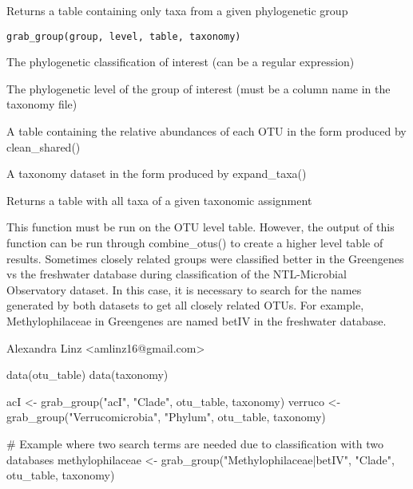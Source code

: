 \documentclass[a4paper]{book}
\begin{document}
%
\begin{Description}\relax
Returns a table containing only taxa from a given phylogenetic group
\end{Description}
%
\begin{Usage}
\begin{verbatim}
grab_group(group, level, table, taxonomy)
\end{verbatim}
\end{Usage}
%
\begin{Arguments}
\begin{ldescription}
\item[\code{group}] 
The phylogenetic classification of interest (can be a regular expression)

\item[\code{level}] 
The phylogenetic level of the group of interest (must be a column name in the taxonomy file)

\item[\code{table}] 
A table containing the relative abundances of each OTU in the form produced by clean\_shared()

\item[\code{taxonomy}] 
A taxonomy dataset in the form produced by expand\_taxa()

\end{ldescription}
\end{Arguments}
%
\begin{Value}
Returns a table with all taxa of a given taxonomic assignment
\end{Value}
%
\begin{Note}\relax
This function must be run on the OTU level table. However, the output of this function can be run through combine\_otus() to create a higher level table of results. Sometimes closely related groups were classified better in the Greengenes vs the freshwater database during classification of the NTL-Microbial Observatory dataset. In this case, it is necessary to search for the names generated by both datasets to get all closely related OTUs.
For example, Methylophilaceae in Greengenes are named betIV in the freshwater database.

\end{Note}
%
\begin{Author}\relax
Alexandra Linz <amlinz16@gmail.com>
\end{Author}
%
\begin{Examples}
\begin{ExampleCode}
 
data(otu_table)
data(taxonomy)

acI <- grab_group("acI", "Clade", otu_table, taxonomy)
verruco <- grab_group("Verrucomicrobia", "Phylum", otu_table, taxonomy)

# Example where two search terms are needed due to classification with two databases
methylophilaceae <- grab_group("Methylophilaceae|betIV", "Clade", otu_table, taxonomy)
\end{ExampleCode}
\end{Examples}
\end{document}
